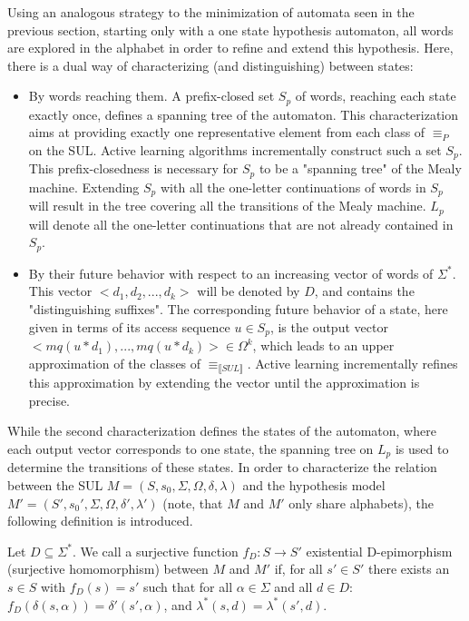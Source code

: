 Using an analogous strategy to the minimization of automata seen in the previous section, starting only with a one state hypothesis automaton, all words are explored in the alphabet in order to refine and extend this hypothesis. Here, there is a dual way of characterizing (and distinguishing) between states\cite{Steffen2011}:
\begin{itemize}
	\item By words reaching them. A prefix-closed set $S_p$ of words, reaching each state exactly once, defines a spanning tree of the automaton. This characterization aims at providing exactly one representative element from each class of $\equiv_P$ on the SUL. Active learning algorithms incrementally construct such a set $S_p$. \\This prefix-closedness is necessary for $S_p$ to be a "spanning tree" of the Mealy machine. Extending $S_p$ with all the one-letter continuations of words in $S_p$ will result in the tree covering all the transitions of the Mealy machine. $L_p$ will denote all the one-letter continuations that are not already contained in $S_p$.
	\item By their future behavior with respect to an increasing vector of words of $\Sigma^*$. This vector $<d_1, d_2,...,d_k>$ will be denoted by $D$, and contains the "distinguishing suffixes". The corresponding future behavior of a state, here given in terms of its access sequence $u\in S_p$, is the output vector$<mq(u*d_1), ..., mq(u*d_k)>\in\Omega^k$, which leads to an upper approximation of the classes of $\equiv_{\llbracket SUL\rrbracket}$. Active learning incrementally refines this approximation by extending the vector until the approximation is precise.
\end{itemize}
While the second characterization defines the states of the automaton, where each output vector corresponds to one state, the spanning tree on $L_p$ is used to determine the transitions of these states. In order to characterize the relation between the SUL $M=(S,s_{0},\Sigma,\Omega,\delta,\lambda)$ and the hypothesis model $M'=(S',s_{0}',\Sigma,\Omega,\delta',\lambda')$ (note, that $M$ and $M'$ only share alphabets), the following definition is introduced. 

\begin{definition}[D-epimorphism]
	Let $D\subseteq\Sigma^*$. We call a surjective function $f_D:S\to S'$ existential D-epimorphism (surjective homomorphism) between $M$ and $M'$ if, for all $s'\in S'$ there exists an $s\in S$ with $f_D(s) = s'$ such that for all $\alpha \in \Sigma$ and all $d\in D$: $f_D(\delta(s, \alpha)) = \delta'(s', \alpha)$, and $\lambda^*(s,d) = \lambda^*(s', d)$. 
\end{definition}

